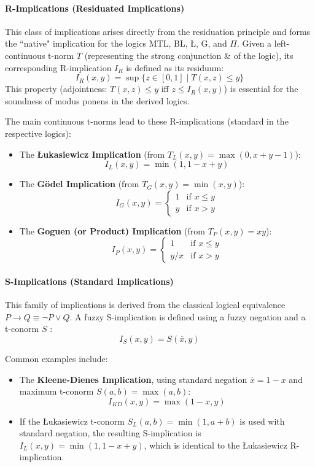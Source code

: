 \paragraph{R-Implications (Residuated Implications)}
This class of implications arises directly from the residuation principle and forms the ``native" implication for the logics MTL, BL, Ł, G, and $\Pi$. Given a left-continuous t-norm $T$ (representing the strong conjunction $\&$ of the logic), its corresponding R-implication $I_R$ is defined as its residuum:
\[
I_R(x, y) = \sup\{z \in [0,1] \mid T(x, z) \le y\}
\]
This property (adjointness: $T(x,z) \le y$ iff $z \le I_R(x, y)$) is essential for the soundness of modus ponens in the derived logics.

\begin{example}
The main continuous t-norms lead to these R-implications (standard in the respective logics):
\begin{itemize}
    \item The \textbf{Łukasiewicz Implication} (from $T_L(x,y) = \max(0, x+y-1)$):
    \[I_L(x,y) = \min(1, 1-x+y)\]
    \item The \textbf{Gödel Implication} (from $T_G(x,y) = \min(x,y)$):
    \[I_G(x,y) = \begin{cases} 1 & \text{if } x \le y \\ y & \text{if } x > y \end{cases}\]
    \item The \textbf{Goguen (or Product) Implication} (from $T_P(x,y) = xy$):
    \[I_P(x,y) = \begin{cases} 1 & \text{if } x \le y \\ y/x & \text{if } x > y \end{cases}\]
\end{itemize}
\end{example}


\paragraph{S-Implications (Standard Implications)}
This family of implications is derived from the classical logical equivalence $P \rightarrow Q \equiv \neg P \lor Q$. A fuzzy S-implication is defined using a fuzzy negation and a t-conorm $S$ \cite[p.59]{FULLER2}:
\[I_S(x,y) = S(\overline{x}, y)\]
\begin{example}[S-Implications]
Common examples include:
\begin{itemize}
    \item The \textbf{Kleene-Dienes Implication}, using standard negation $\overline{x}=1-x$ and maximum t-conorm $S(a,b)=\max(a,b)$:
    \[I_{KD}(x,y) = \max(1-x, y)\]
    \item If the Łukasiewicz t-conorm $S_L(a,b) = \min(1, a+b)$ is used with standard negation, the resulting S-implication is $I_L(x,y) = \min(1, 1-x+y)$, which is identical to the Łukasiewicz R-implication.
\end{itemize}
\end{example}

